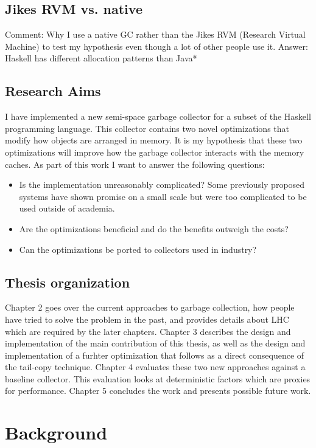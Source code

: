 \documentclass[a4paper,oneside]{memoir}
\newcommand{\makecomment}[1]{{\color{red} Comment: #1}}
\begin{document}
\section{Jikes RVM vs. native}
\makecomment{Why I use a native GC rather than the Jikes RVM (Research Virtual Machine)
to test my hypothesis even though a lot of other people use it.
Answer: Haskell has different allocation patterns than Java*}

\section{Research Aims}
I have implemented a new semi-space garbage collector for a subset of the
Haskell programming language. This collector contains two novel optimizations
that modify how objects are arranged in memory. It is my hypothesis that these
two optimizations will improve how the garbage collector interacts with the
memory caches. As part of this work I want to answer the following questions:
\begin{itemize}
  \item Is the implementation unreasonably complicated? Some previously proposed
    systems have shown promise on a small scale but were too complicated to be
    used outside of academia.
  \item Are the optimizations beneficial and do the benefits outweigh the costs?
  \item Can the optimizations be ported to collectors used in industry?
\end{itemize}

\section{Thesis organization}
Chapter 2 goes over the current approaches to garbage collection, how people
have tried to solve the problem in the past, and provides details about
LHC which are required by the later chapters.
Chapter 3 describes the design and implementation of the main contribution of
this thesis, as well as the design and implementation of a furhter optimization
that follows as a direct consequence of the tail-copy technique.
Chapter 4 evaluates these two new approaches against a baseline collector. This
evaluation looks at deterministic factors which are proxies for performance.
Chapter 5 concludes the work and presents possible future work.

\chapter{Background}
\end{document}
